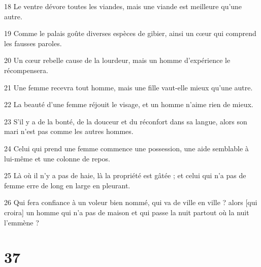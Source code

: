 \par 18 Le ventre dévore toutes les viandes, mais une viande est meilleure qu'une autre.
\par 19 Comme le palais goûte diverses espèces de gibier, ainsi un cœur qui comprend les fausses paroles.
\par 20 Un cœur rebelle cause de la lourdeur, mais un homme d'expérience le récompensera.
\par 21 Une femme recevra tout homme, mais une fille vaut-elle mieux qu'une autre.
\par 22 La beauté d'une femme réjouit le visage, et un homme n'aime rien de mieux.
\par 23 S'il y a de la bonté, de la douceur et du réconfort dans sa langue, alors son mari n'est pas comme les autres hommes.
\par 24 Celui qui prend une femme commence une possession, une aide semblable à lui-même et une colonne de repos.
\par 25 Là où il n'y a pas de haie, là la propriété est gâtée ; et celui qui n'a pas de femme erre de long en large en pleurant.
\par 26 Qui fera confiance à un voleur bien nommé, qui va de ville en ville ? alors [qui croira] un homme qui n'a pas de maison et qui passe la nuit partout où la nuit l'emmène ?

\chapter{37}

